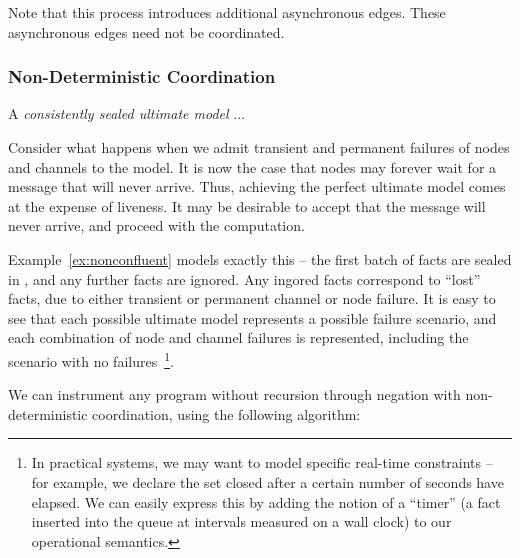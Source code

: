 Note that this process introduces additional asynchronous edges.  These asynchronous edges need not be coordinated. 


\subsubsection{Non-Deterministic Coordination}

\begin{definition}
A {\em consistently sealed ultimate model} ...
\end{definition}


Consider what happens when we admit transient and permanent failures of nodes and channels to the model.  It is now the case that nodes may forever wait for a message that will never arrive.  Thus, achieving the perfect ultimate model comes at the expense of liveness.  It may be desirable to accept that the message will never arrive, and proceed with the computation.

Example~\ref{ex:nonconfluent} models exactly this -- the first batch of  facts are sealed in , and any further  facts are ignored.  Any ingored  facts correspond to ``lost''  facts, due to either transient or permanent channel or node failure.  It is easy to see that each possible ultimate model represents a possible failure scenario, and each combination of node and channel failures is represented, including the scenario with no failures~\footnote{In practical systems, we may want to model specific real-time constraints -- for example, we declare the set closed after a certain number of seconds have elapsed.  We can easily express this by adding the notion of a ``timer'' (a fact inserted into the queue at intervals measured on a wall clock) to our operational semantics.}.

We can instrument any \lang program without recursion through negation with non-deterministic coordination, using the following algorithm:

